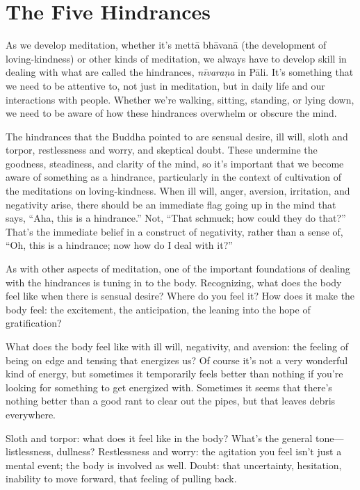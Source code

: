 \chapter{The Five Hindrances}

As we develop meditation, whether it’s mettā bhāvanā (the development of
loving-kindness) or other kinds of meditation, we always have to develop
skill in dealing with what are called the hindrances, \emph{nīvaraṇa} in
Pāli. It’s something that we need to be attentive to, not just in
meditation, but in daily life and our interactions with people. Whether
we’re walking, sitting, standing, or lying down, we need to be aware of
how these hindrances overwhelm or obscure the mind.

The hindrances that the Buddha pointed to are sensual desire, ill will,
sloth and torpor, restlessness and worry, and skeptical doubt. These
undermine the goodness, steadiness, and clarity of the mind, so it’s
important that we become aware of something as a hindrance, particularly
in the context of cultivation of the meditations on loving-kindness.
When ill will, anger, aversion, irritation, and negativity arise, there
should be an immediate flag going up in the mind that says, “Aha, this
is a hindrance.” Not, “That schmuck; how could they do that?” That’s the
immediate belief in a construct of negativity, rather than a sense of,
“Oh, this is a hindrance; now how do I deal with it?”

As with other aspects of meditation, one of the important foundations of
dealing with the hindrances is tuning in to the body. Recognizing, what
does the body feel like when there is sensual desire? Where do you feel
it? How does it make the body feel: the excitement, the anticipation,
the leaning into the hope of gratification?

What does the body feel like with ill will, negativity, and aversion:
the feeling of being on edge and tensing that energizes us? Of course
it’s not a very wonderful kind of energy, but sometimes it temporarily
feels better than nothing if you’re looking for something to get
energized with. Sometimes it seems that there’s nothing better than a
good rant to clear out the pipes, but that leaves debris everywhere.

Sloth and torpor: what does it feel like in the body? What’s the general
tone—listlessness, dullness? Restlessness and worry: the agitation you
feel isn’t just a mental event; the body is involved as well. Doubt:
that uncertainty, hesitation, inability to move forward, that feeling of
pulling back.

